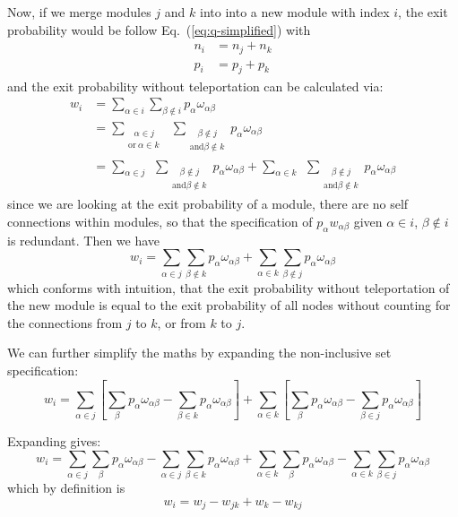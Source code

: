 \documentclass[12pt,a4paper]{article}
\begin{document}
Now, if we merge modules \(j\) and \(k\) into into a new module with index \(i\), the exit probability would be follow Eq.~(\ref{eq:q-simplified}) with
\begin{align}
    n_i &= n_j +n_k\\
    p_i &= p_j +p_k
\end{align}
and the exit probability without teleportation can be calculated via:
\begin{align}
    w_i &= \sum_{\alpha\in i} \sum_{\beta\notin i} p_\alpha\omega_{\alpha\beta}\\
        &= \sum_{\substack{~~~\alpha\in j\\\mathrm{or}~\alpha\in k}} ~~ \sum_{\substack{~~~~\beta\notin j\\\mathrm{and}\beta\notin k}} p_\alpha\omega_{\alpha\beta}\\
        &= \sum_{\alpha\in j} ~~ \sum_{\substack{~~~~\beta\notin j\\\mathrm{and}\beta\notin k}} p_\alpha\omega_{\alpha\beta}
          +\sum_{\alpha\in k} ~~ \sum_{\substack{~~~~\beta\notin j\\\mathrm{and}\beta\notin k}} p_\alpha\omega_{\alpha\beta}
\end{align}
since we are looking at the exit probability of a module, there are no self connections within modules, so that the specification of \(p_\alpha w_{\alpha\beta}\) given \(\alpha\in i\), \(\beta\notin i\) is redundant. Then we have
\begin{equation}
    w_i = \sum_{\alpha\in j} \sum_{\beta\notin k} p_\alpha\omega_{\alpha\beta}
          +\sum_{\alpha\in k} \sum_{\beta\notin j} p_\alpha\omega_{\alpha\beta}
\end{equation}
which conforms with intuition, that the exit probability without teleportation of the new module is equal to the exit probability of all nodes without counting for the connections from \(j\) to \(k\), or from \(k\) to \(j\).

We can further simplify the maths by expanding the non-inclusive set specification:
\begin{equation}
    w_i = \sum_{\alpha\in j} \left[ \sum_\beta p_\alpha\omega_{\alpha\beta} -\sum_{\beta\in k} p_\alpha\omega_{\alpha\beta} \right]
          +\sum_{\alpha\in k} \left[ \sum_\beta p_\alpha\omega_{\alpha\beta} -\sum_{\beta\in j} p_\alpha\omega_{\alpha\beta} \right]
\end{equation}

Expanding gives:
\begin{equation}
    w_i = \sum_{\alpha\in j} \sum_\beta p_\alpha\omega_{\alpha\beta} -\sum_{\alpha\in j}\sum_{\beta\in k} p_\alpha\omega_{\alpha\beta}
          +\sum_{\alpha\in k} \sum_\beta p_\alpha\omega_{\alpha\beta} -\sum_{\alpha\in k}\sum_{\beta\in j} p_\alpha\omega_{\alpha\beta}
\end{equation}
which by definition is
\begin{equation}
    w_i = w_j -w_{jk} +w_k -w_{kj}
\label{eq:w_i}
\end{equation}
\end{document}
